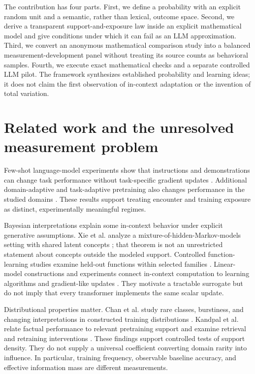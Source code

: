 \documentclass[11pt,letterpaper]{article}
\theoremstyle{definition}\newtheorem{definition}[theorem]{Definition}
\begin{document}
The contribution has four parts. First, we define a probability with an explicit random unit and a semantic, rather than lexical, outcome space. Second, we derive a transparent support-and-exposure law inside an explicit mathematical model and give conditions under which it can fail as an LLM approximation. Third, we convert an anonymous mathematical comparison study into a balanced measurement-development panel without treating its source counts as behavioral samples. Fourth, we execute exact mathematical checks and a separate controlled LLM pilot. The framework synthesizes established probability and learning ideas; it does not claim the first observation of in-context adaptation or the invention of total variation.

\section{Related work and the unresolved measurement problem}
Few-shot language-model experiments show that instructions and demonstrations can change task performance without task-specific gradient updates \cite{brown2020}. Additional domain-adaptive and task-adaptive pretraining also changes performance in the studied domains \cite{gururangan2020}. These results support treating encounter and training exposure as distinct, experimentally meaningful regimes.

Bayesian interpretations explain some in-context behavior under explicit generative assumptions. Xie et al. analyze a mixture-of-hidden-Markov-models setting with shared latent concepts \cite{xie2022}; that theorem is not an unrestricted statement about concepts outside the modeled support. Controlled function-learning studies examine held-out functions within selected families \cite{garg2022}. Linear-model constructions and experiments connect in-context computation to learning algorithms and gradient-like updates \cite{akyurek2023,vonoswald2023}. They motivate a tractable surrogate but do not imply that every transformer implements the same scalar update.

Distributional properties matter. Chan et al. study rare classes, burstiness, and changing interpretations in constructed training distributions \cite{chan2022}. Kandpal et al. relate factual performance to relevant pretraining support and examine retrieval and retraining interventions \cite{kandpal2023}. These findings support controlled tests of support density. They do not supply a universal coefficient converting domain rarity into influence. In particular, training frequency, observable baseline accuracy, and effective information mass are different measurements.
\end{document}
